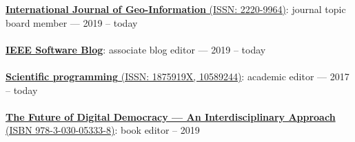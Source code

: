 \href{https://www.mdpi.com/journal/ijgi/}{\textbf{International Journal of Geo-Information} (ISSN: 2220-9964)}: journal topic board member --- 2019 -- today
\\ \halfblankline \\
\href{http://blog.ieeesoftware.org/}{\textbf{IEEE Software Blog}}: associate blog editor --- 2019 -- today
\\ \halfblankline \\
\href{https://www.hindawi.com/journals/sp/}{\textbf{Scientific programming} (ISSN: 1875919X, 10589244)}: academic editor --- 2017 -- today
\\ \halfblankline \\
\href{https://www.springer.com/gp/book/9783030053321}{\textbf{The Future of Digital Democracy --- An Interdisciplinary Approach} (ISBN 978-3-030-05333-8)}: book editor -- 2019
